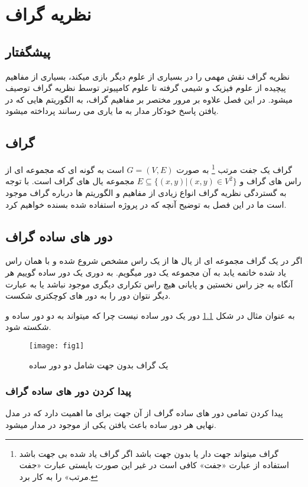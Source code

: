 \chapter{نظریه گراف}
\section{پیشگفتار} 
نظریه گراف نقش مهمی را در بسیاری از علوم دیگر بازی میکند، بسیاری از مفاهیم پیچیده از علوم فیزیک و شیمی گرفته تا علوم کامپیوتر توسط نظریه گراف توصیف میشود.
در این فصل علاوه بر مرور مختصر بر مفاهیم گراف، به الگوریتم هایی که در یافتن پاسخ خودکار مدار به ما یاری می رسانند پرداخته میشود.

\section{گراف}
گراف یک جفت مرتب
\footnote{
	گراف میتواند جهت دار یا بدون جهت باشد اگر گراف یاد شده بی جهت باشد استفاده از عبارت 
	«جفت» کافی است
	در غیر این صورت بایستی عبارت «جفت مرتب» را به کار برد. 
}
 به صورت
 $G = (V,E)$
 است به گونه ای که
 مجموعه ای از راس های گراف و
 $ E \subseteq \{(x,y)|(x,y) \in V^2 \}  $
 مجموعه یال های گراف است.
 با توجه به گستردگی نظریه گراف انواع زیادی از مفاهیم و الگوریتم ها درباره گراف موجود است
 ما در این فصل به توضیح آنچه که در پروژه استفاده شده بسنده خواهیم کرد.
\section{دور های ساده گراف}
اگر در یک گراف مجموعه ای از یال ها از یک راس مشخص شروع شده و با همان راس یاد شده خاتمه یابد
به آن مجموعه یک دور میگویم.
به دوری یک دور ساده
 گوییم هر آنگاه به جز راس نخستین و پایانی هیچ راس تکراری دیگری موجود نباشد یا به
 عبارت دیگر نتوان دور را به دور های کوچکتری شکست.
 
 به عنوان مثال در شکل
 \ref{fig:fig1} 
 دور
 یک دور ساده نیست چرا که میتواند به دو دور ساده
  و
   شکسته شود.
 
 \begin{figure}[ht]
 	\centerline{\texttt{[image: fig1]}}
 	\caption{یک گراف بدون جهت شامل دو دور ساده}
 	\label{fig:fig1}
 \end{figure}
\subsection{پیدا کردن دور های ساده گراف}
پیدا کردن تمامی دور های ساده گراف از آن جهت برای ما اهمیت دارد که در مدل نهایی هر دور ساده
باعث یافتن یکی از
موجود در مدار میشود.

